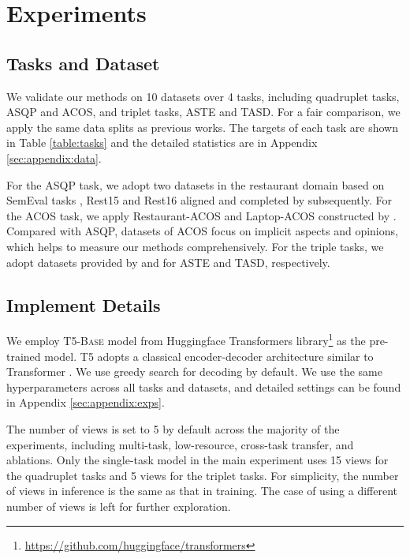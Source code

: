 \documentclass[11pt]{article}
\begin{document}
 
 
 
 
\section{Experiments}
\label{sec:exps}

\subsection{Tasks and Dataset}
We validate our methods on 10 datasets over 4 tasks, including quadruplet tasks, ASQP and ACOS, and triplet tasks, ASTE and TASD. For a fair comparison, we apply the same data splits as previous works. The targets of each task are shown in Table \ref{table:tasks} and the detailed statistics are in Appendix \ref{sec:appendix:data}. 

For the ASQP task, we adopt two datasets in the restaurant domain based on SemEval tasks \cite{pontiki-etal-2015-semeval, pontiki-etal-2016-semeval}, Rest15 and Rest16 aligned and completed by \citet{zhang-etal-2021-aspect} subsequently. For the ACOS task, we apply Restaurant-ACOS and Laptop-ACOS constructed by \citet{cai-etal-2021-aspect}. Compared with ASQP, datasets of ACOS focus on implicit aspects and opinions, which helps to measure our methods comprehensively.
For the triple tasks, we adopt datasets provided by \citet{xu-etal-2020-position} and \citet{DBLP:conf/aaai/WanYDLQP20} for ASTE \cite{DBLP:conf/aaai/PengXBHLS20} and TASD, respectively.



\subsection{Implement Details}
We employ T5-\textsc{Base} model \cite{DBLP:journals/jmlr/RaffelSRLNMZLL20} from Huggingface Transformers library\footnote{\url{https://github.com/huggingface/transformers}}\cite{wolf-etal-2020-transformers} as the pre-trained model. T5 adopts a classical encoder-decoder architecture similar to Transformer \cite{DBLP:conf/nips/VaswaniSPUJGKP17}.
We use greedy search for decoding by default. We use the same hyperparameters across all tasks and datasets, and detailed settings can be found in Appendix \ref{sec:appendix:exps}.

The number of views  is set to 5 by default across the majority of the experiments, including multi-task, low-resource, cross-task transfer, and ablations.
Only the single-task model in the main experiment uses 15 views for the quadruplet tasks and 5 views for the triplet tasks. For simplicity, the number of views in inference is the same as that in training. The case of using a different number of views is left for further exploration.
\end{document}
